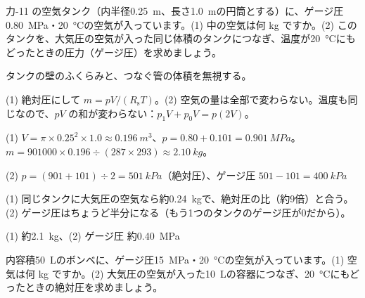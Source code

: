\begin{reidai}[空気タンクの中の空気]
\label{ph:熱-3:ex15}力-11 の空気タンク（内半径\qty{0.25}{m}、長さ\qty{1.0}{m}の円筒とする）に、ゲージ圧\qty{0.80}{MPa}・\qty{20}{\celsius}の空気が入っています。(1) 中の空気は何 kg ですか。(2) このタンクを、大気圧の空気が入った同じ体積のタンクにつなぎ、温度が\qty{20}{\celsius}にもどったときの圧力（ゲージ圧）を求めましょう。
\par{} タンクの壁のふくらみと、つなぐ管の体積を無視する。
\par\kangaekata (1) 絶対圧にして $m=pV/(R_{\mathrm s}T)$。(2) 空気の量は全部で変わらない。温度も同じなので、$pV$ の和が変わらない：$p_1V+p_0V=p(2V)$。
\par\shiki (1) $V=\pi\times0.25^2\times1.0\approx\qty{0.196}{m^3}$、$p=0.80+0.101=\qty{0.901}{MPa}$。$m=\num{901000}\times0.196\div(287\times293)\approx\qty{2.10}{kg}$。\par
(2) $p=(901+101)\div2=\qty{501}{kPa}$（絶対圧）、ゲージ圧 $501-101=\qty{400}{kPa}$
\par{} (1) 同じタンクに大気圧の空気なら約\qty{0.24}{kg}で、絶対圧の比（約9倍）と合う。(2) ゲージ圧はちょうど半分になる（もう1つのタンクのゲージ圧が0だから）。
\par\kotae (1) 約\qty{2.1}{kg}、(2) ゲージ圧 約\qty{0.40}{MPa}
\end{reidai}
\begin{jibun}
内容積\qty{50}{L}のボンベに、ゲージ圧\qty{15}{MPa}・\qty{20}{\celsius}の空気が入っています。(1) 空気は何 kg ですか。(2) 大気圧の空気が入った\qty{10}{L}の容器につなぎ、\qty{20}{\celsius}にもどったときの絶対圧を求めましょう。
\end{jibun}


